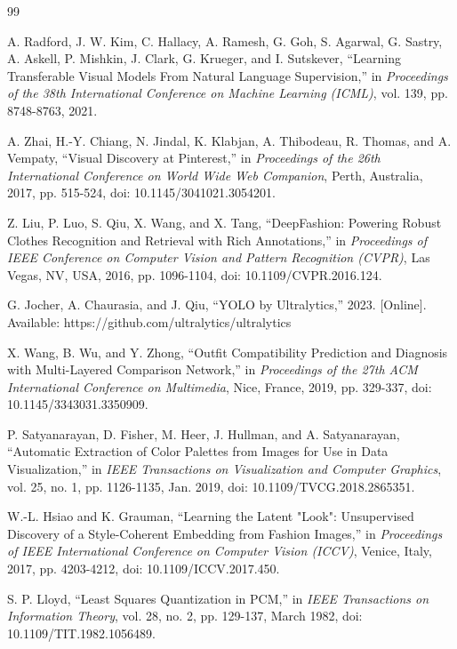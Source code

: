 \documentclass[12pt,a4paper]{report}
\begin{document}
\renewcommand{\bibname}{REFERENCES}
\begin{thebibliography}{99}

A. Radford, J. W. Kim, C. Hallacy, A. Ramesh, G. Goh, S. Agarwal, G. Sastry, A. Askell, P. Mishkin, J. Clark, G. Krueger, and I. Sutskever, ``Learning Transferable Visual Models From Natural Language Supervision,'' in \textit{Proceedings of the 38th International Conference on Machine Learning (ICML)}, vol. 139, pp. 8748-8763, 2021.

A. Zhai, H.-Y. Chiang, N. Jindal, K. Klabjan, A. Thibodeau, R. Thomas, and A. Vempaty, ``Visual Discovery at Pinterest,'' in \textit{Proceedings of the 26th International Conference on World Wide Web Companion}, Perth, Australia, 2017, pp. 515-524, doi: 10.1145/3041021.3054201.

Z. Liu, P. Luo, S. Qiu, X. Wang, and X. Tang, ``DeepFashion: Powering Robust Clothes Recognition and Retrieval with Rich Annotations,'' in \textit{Proceedings of IEEE Conference on Computer Vision and Pattern Recognition (CVPR)}, Las Vegas, NV, USA, 2016, pp. 1096-1104, doi: 10.1109/CVPR.2016.124.

G. Jocher, A. Chaurasia, and J. Qiu, ``YOLO by Ultralytics,'' 2023. [Online]. Available: https://github.com/ultralytics/ultralytics

X. Wang, B. Wu, and Y. Zhong, ``Outfit Compatibility Prediction and Diagnosis with Multi-Layered Comparison Network,'' in \textit{Proceedings of the 27th ACM International Conference on Multimedia}, Nice, France, 2019, pp. 329-337, doi: 10.1145/3343031.3350909.

P. Satyanarayan, D. Fisher, M. Heer, J. Hullman, and A. Satyanarayan, ``Automatic Extraction of Color Palettes from Images for Use in Data Visualization,'' in \textit{IEEE Transactions on Visualization and Computer Graphics}, vol. 25, no. 1, pp. 1126-1135, Jan. 2019, doi: 10.1109/TVCG.2018.2865351.

W.-L. Hsiao and K. Grauman, ``Learning the Latent "Look": Unsupervised Discovery of a Style-Coherent Embedding from Fashion Images,'' in \textit{Proceedings of IEEE International Conference on Computer Vision (ICCV)}, Venice, Italy, 2017, pp. 4203-4212, doi: 10.1109/ICCV.2017.450.

S. P. Lloyd, ``Least Squares Quantization in PCM,'' in \textit{IEEE Transactions on Information Theory}, vol. 28, no. 2, pp. 129-137, March 1982, doi: 10.1109/TIT.1982.1056489.


\end{thebibliography}
\end{document}

